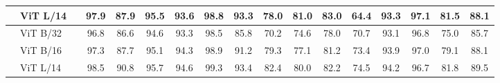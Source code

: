 \documentclass{article} \usepackage{iclr2023_conference,times}
\begin{document}
\begin{table}
{\begin{tabular}{cl|cccccccccccccc|c}
			 & ViT L/14     &  & 97.9                                       & 87.9                                        & 95.5                                          & 93.6                                    & 98.8                                       & 93.3                                       & 78.0                                        & 81.0                                      & 83.0                                   & 64.4                                        & 93.3                                    & 97.1                                       & 81.5                                        & 88.1                                        \\ \midrule \multirow{4}{0em}{\rotatebox[origin=c]{90}{Ours}}
			 & ViT B/32     &  & 96.8                                       & 86.6                                        & 94.6                                          & 93.3                                    & 98.5                                       & 85.8                                       & 70.2                                        & 74.6                                      & 78.0                                   & 70.7                                        & 93.1                                    & 96.8                                       & 75.0                                        & 85.7                                        \\
			 & ViT B/16     &  & 97.3                                       & 87.7                                        & 95.1                                          & 94.3                                    & 98.9                                       & 91.2                                       & 79.3                                        & 77.1                                      & 81.2                                   & 73.4                                        & 93.9                                    & 97.0                                       & 79.1                                        & 88.1                                        \\
			 & ViT L/14     &  & 98.5                                       & 90.8                                        & 95.7                                          & 94.6                                    & 99.3                                       & 93.4                                       & 82.4                                        & 80.0                                      & 82.2                                   & 74.5                                        & 94.2                                    & 96.7                                       & 81.8                                        & 89.5                                        \\

\end{tabular}}
\end{table}
\end{document}
